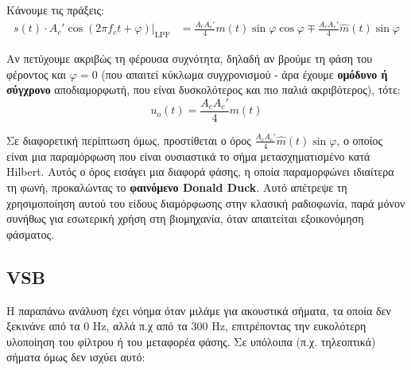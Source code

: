 \documentclass[11pt,a4paper,notitlepage,fleqn]{article}
\begin{document}
Κάνουμε τις πράξεις:
\begin{align*}
	\left. s(t)\cdot A_c' \cos(2πf_ct+φ) \right|_{\mathrm{LPF}}
	&= \frac{A_cA_c'}{4}m(t)\sin φ\cos φ
	\mp \frac{A_cA_c'}{4}\hat m(t) \sin φ
\end{align*}

Αν πετύχουμε ακριβώς τη φέρουσα συχνότητα, δηλαδή αν βρούμε τη φάση του φέροντος και
\( φ = 0 \) (που απαιτεί κύκλωμα συγχρονισμού - άρα έχουμε \textbf{ομόδυνο ή σύγχρονο}
αποδιαμορφωτή, που είναι δυσκολότερος και πιο παλιά ακριβότερος), τότε:
\[
u_o(t) = \frac{A_cA_c'}{4}m(t)
\]

Σε διαφορετική περίπτωση όμως, προστίθεται ο όρος \( \frac{A_cA_c'}{4}\hat m(t) \sin φ \),
ο οποίος είναι μια παραμόρφωση που είναι ουσιαστικά το σήμα μετασχηματισμένο κατά
Hilbert. Αυτός ο όρος εισάγει μια διαφορά φάσης, η οποία παραμορφώνει ιδιαίτερα τη
φωνή, προκαλώντας το \textbf{φαινόμενο Donald Duck}.
Αυτό απέτρεψε τη χρησιμοποίηση αυτού του είδους διαμόρφωσης στην κλασική ραδιοφωνία, παρά
μόνον συνήθως για εσωτερική χρήση στη βιομηχανία, όταν απαιτείται εξοικονόμηση φάσματος.

\subsection{VSB}
Η παραπάνω ανάλυση έχει νόημα όταν μιλάμε για ακουστικά σήματα, τα οποία δεν ξεκινάνε από
τα 0 Hz, αλλά π.χ από τα 300 Hz, επιτρέποντας την ευκολότερη υλοποίηση του φίλτρου ή του
μεταφορέα φάσης. Σε υπόλοιπα (π.χ. τηλεοπτικά) σήματα όμως δεν ισχύει αυτό:

\begin{center}
\end{center}
\end{document}

